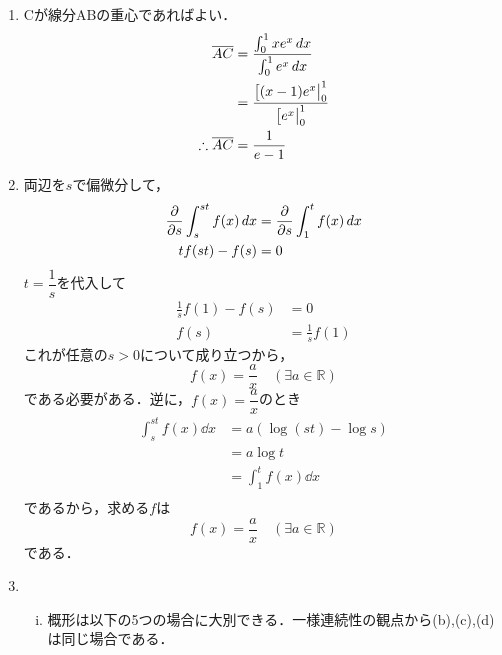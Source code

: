 



    
\maketitle

\begin{enumerate}[(1)]
    \item Cが線分ABの重心であればよい．
    \begin{align}
        \overline{AC}
        &=\frac{\int_0^1xe^x\dd{x}}{\int_0^1e^x\dd{x}}\\
        &=\frac{\eval[(x-1)e^x|_{0}^{1}}{\eval[e^x|_{0}^{1}}\\
        \therefore
        \overline{AC}
        &=\frac{1}{e-1}
    \end{align}
    \item 両辺を$s$で偏微分して，
    \begin{align}
        \pdv{s}\int_s^{st}f(x)\dd{x}&=\pdv{s}\int_1^{t}f(x)\dd{x}\\
        tf(st)-f(s)&=0
    \end{align}
    $t=\dfrac{1}{s}$を代入して
    \begin{align}
        \frac{1}{s}f(1)-f(s)&=0\\
        f(s)&=\frac{1}{s}f(1)
    \end{align}
    これが任意の$s>0$について成り立つから，
    \begin{equation}
        f(x)=\frac{a}{x} \quad (\exists a\in\mathbb{R})
    \end{equation}
    である必要がある．逆に，$f(x)=\dfrac{a}{x}$のとき
    \begin{align}
        \int_s^{st}f(x)\dd{x}
        &=a(\log(st)-\log s)\\
        &=a\log t\\
        &=\int_1^{t}f(x)\dd{x}\\
    \end{align}
    であるから，求める$f$は
    \begin{equation}
        f(x)=\frac{a}{x} \quad (\exists a\in\mathbb{R})
    \end{equation}
    である．
    \item 
    \begin{enumerate}[(i)]
        \item 概形は以下の5つの場合に大別できる．一様連続性の観点から(b),(c),(d)は同じ場合である．
        \begin{figure}[H]
            \begin{minipage}[t]{.33\textwidth}
                \centering
\end{minipage}
\end{figure}
\end{enumerate}
\end{enumerate}
